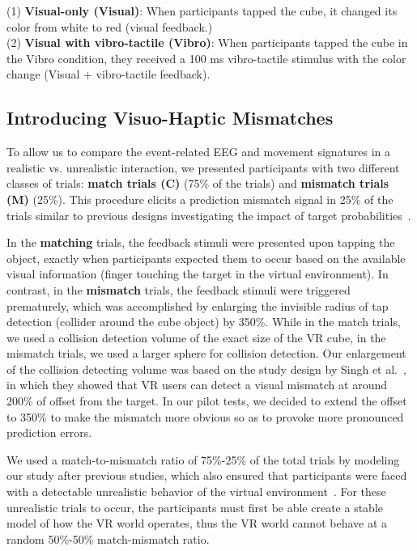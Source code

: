 (1) \textbf{Visual-only (Visual)}: When participants tapped the cube, it changed its color from white to red (visual feedback.)\\
\indent(2) \textbf{Visual with vibro-tactile (Vibro)}: When participants tapped the cube in the Vibro condition, they received a 100 ms vibro-tactile stimulus with the color change (Visual + vibro-tactile feedback).

\subsection{Introducing Visuo-Haptic Mismatches}
To allow us to compare the event-related EEG and movement signatures in a realistic vs. unrealistic interaction, we presented participants with two different classes of trials: \textbf{match trials (C)} (75\% of the trials) and \textbf{mismatch trials (M)} (25\%). This procedure elicits a prediction mismatch signal in 25\% of the trials similar to previous designs investigating the impact of target probabilities~\cite{Polich2007-cf}.  %

In the \textbf{matching} trials, the feedback stimuli were presented upon tapping the object, exactly when participants expected them to occur based on the available visual information (finger touching the target in the virtual environment). In contrast, in the \textbf{mismatch} trials, the feedback stimuli were triggered prematurely, which was accomplished by enlarging the invisible radius of tap detection (collider around the cube object) by 350\%. While in the match trials, we used a collision detection volume of the exact size of the VR cube, in the mismatch trials, we used a larger sphere for collision detection. Our enlargement of the collision detecting volume was based on the study design by Singh et al.~\cite{Singh2018-qi}, in which they showed that VR users can detect a visual mismatch at around 200\% of offset from the target. In our pilot tests, we decided to extend the offset to 350\% to make the mismatch more obvious so as to provoke more pronounced prediction errors. 

We used a match-to-mismatch ratio of 75\%-25\% of the total trials by modeling our study after previous studies, which also ensured that participants were faced with a detectable unrealistic behavior of the virtual environment~\cite{Liao2011-po,Wiersema2007-jf,Donchin1988-gq}. For these unrealistic trials to occur, the participants must first be able create a stable model of how the VR world operates, thus the VR world cannot behave at a random 50\%-50\% match-mismatch ratio. 

